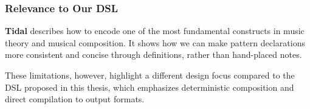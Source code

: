 
\subsubsection{Relevance to Our DSL}

\textbf{Tidal} describes how to encode one of the most fundamental constructs in music theory and musical composition.
It shows how we can make pattern declarations more consistent and concise through definitions, rather than hand-placed
notes.

These limitations, however, highlight a different design focus compared to the DSL proposed in this thesis,
which emphasizes deterministic composition and direct compilation to output formats.
